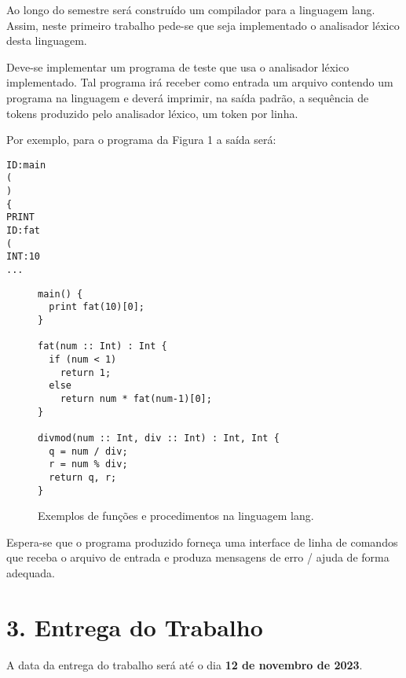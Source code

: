 \documentclass[a4paper,11pt]{article}
\begin{document}
Ao longo do semestre será construído um compilador para a linguagem lang.
Assim, neste primeiro trabalho pede-se que seja implementado o analisador léxico
desta linguagem.

Deve-se implementar um programa de teste que usa o analisador léxico implementado.
Tal programa irá receber como entrada um arquivo contendo um programa na linguagem e
deverá imprimir, na saída padrão, a sequência de tokens produzido pelo
analisador léxico, um token por linha.

Por exemplo, para o programa da Figura 1 a saída será:
\begin{lstlisting}
ID:main
(
)
{
PRINT
ID:fat
(
INT:10
...
\end{lstlisting}


\begin{figure}
\begin{lstlisting}[language=uL]
main() {
  print fat(10)[0];
}

fat(num :: Int) : Int {
  if (num < 1)
    return 1;
  else
    return num * fat(num-1)[0];
}

divmod(num :: Int, div :: Int) : Int, Int {
  q = num / div;
  r = num % div;
  return q, r;
}

\end{lstlisting}
\caption{Exemplos de funções e procedimentos  na linguagem lang.}
\label{fig:prog}
\end{figure}
Espera-se que o programa produzido forneça uma interface de linha de comandos
que receba o arquivo de entrada e produza mensagens de erro / ajuda de forma
adequada.
\section*{3. Entrega do Trabalho}
\label{sec:org260cf3c}

A data da entrega do trabalho será até o dia \textbf{12 de novembro de 2023}.
\end{document}
